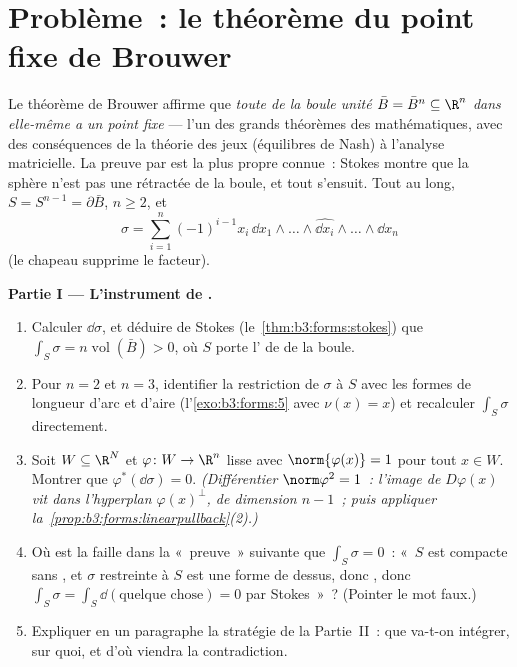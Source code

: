 \section{Problème~: le théorème du point fixe de Brouwer}

\begin{problem}\label{pb:b3:forms:1}
Le théorème de Brouwer affirme que \emph{toute  de la boule unité  $\bar B = \bar B^n
\subseteq \R^n$ dans elle-même a un point fixe} --- l'un des
grands théorèmes des mathématiques, avec des conséquences de
la théorie des jeux (équilibres de Nash) à l'analyse
matricielle. La preuve par  est la plus
propre connue~: Stokes montre que la sphère n'est pas une
rétractée de la boule, et tout s'ensuit. Tout au long, $S =
S^{n-1} = \partial\bar B$, $n \geq 2$, et
\[
\sigma = \sum_{i=1}^n(-1)^{i-1}x_i\,
\dd x_1\wedge\dots\wedge\widehat{\dd x_i}\wedge\dots\wedge
\dd x_n
\]
(le chapeau supprime le facteur).

\medskip
\noindent\textbf{Partie I --- L'instrument de .}
\begin{enumerate}
  \item Calculer $\dd\sigma$, et déduire de Stokes
        (le~\cref{thm:b3:forms:stokes}) que $\int_S\sigma =
        n\operatorname{vol}(\bar B) > 0$, où $S$ porte
        l' de  de la boule.
  \item Pour $n = 2$ et $n = 3$, identifier la restriction de
        $\sigma$ à $S$ avec les formes de longueur d'arc et
        d'aire (l'\cref{exo:b3:forms:5} avec $\nu(x) = x$) et
        recalculer $\int_S\sigma$ directement.
  \item Soit $W \subseteq \R^N$  et $\varphi\colon W
        \to \R^n$ lisse avec $\norm{\varphi(x)} = 1$ pour
        tout $x \in W$. Montrer que
        $\varphi^*(\dd\sigma) = 0$. \emph{(Différentier
        $\norm\varphi^2 = 1$~: l'image de $D\varphi(x)$
        vit dans l'hyperplan $\varphi(x)^\perp$, de
        dimension $n - 1$~; puis appliquer
        la~\cref{prop:b3:forms:linearpullback}(2).)}
  \item Où est la faille dans la «~preuve~» suivante que
        $\int_S\sigma = 0$~: «~$S$ est compacte sans ,
        et $\sigma$ restreinte à $S$ est une forme de 
         dessus, donc , donc $\int_S\sigma =
        \int_S\dd(\text{quelque chose}) = 0$ par Stokes~»~?
        (Pointer le mot faux.)
  \item Expliquer en un paragraphe la stratégie de la
        Partie~II~: que va-t-on intégrer, sur quoi, et d'où
        viendra la contradiction.
\end{enumerate}


\end{problem}
